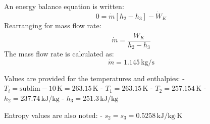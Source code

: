 An energy balance equation is written:  
\[
0 = \dot{m} \left[ h_2 - h_3 \right] - \dot{W}_K
\]  
Rearranging for mass flow rate:  
\[
\dot{m} = \frac{\dot{W}_K}{h_2 - h_3}
\]  
The mass flow rate is calculated as:  
\[
\dot{m} = 1.145 \, \text{kg/s}
\]  

Values are provided for the temperatures and enthalpies:  
- \(T_i = \text{sublim} - 10 \, \text{K} = 263.15 \, \text{K}\)  
- \(T_1 = 263.15 \, \text{K}\)  
- \(T_2 = 257.154 \, \text{K}\)  
- \(h_2 = 237.74 \, \text{kJ/kg}\)  
- \(h_3 = 251.3 \, \text{kJ/kg}\)  

Entropy values are also noted:  
- \(s_2 = s_3 = 0.5258 \, \text{kJ/kg·K}\)